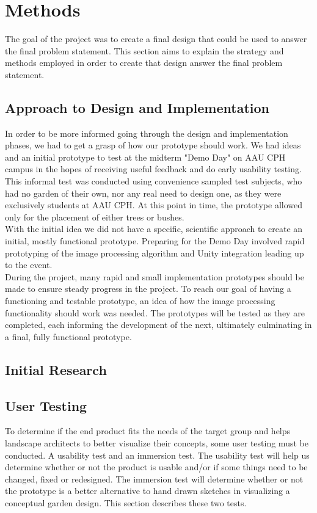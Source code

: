 \chapter{Methods}
The goal of the project was to create a final design that could be used to answer the final problem statement. This section aims to explain the strategy and methods employed in order to create that design answer the final problem statement.

 
\section{Approach to Design and Implementation}

In order to be more informed going through the design and implementation phases, we had to get a grasp of how our prototype should work. We had ideas and an initial prototype to test at the midterm "Demo Day" on AAU CPH campus in the hopes of receiving useful feedback and do early usability testing. This informal test was conducted using convenience sampled test subjects, who had no garden of their own, nor any real need to design one, as they were exclusively students at AAU CPH. At this point in time, the prototype allowed only for the placement of either trees or bushes.\\

With the initial idea we did not have a specific, scientific approach to create an initial, mostly functional prototype. Preparing for the Demo Day involved rapid prototyping of the image processing algorithm and Unity integration leading up to the event.\\

During the project, many rapid and small implementation prototypes should be made to ensure steady progress in the project.
To reach our goal of having a functioning and testable prototype, an idea of how the image processing functionality should work was needed. The prototypes will be tested as they are completed, each informing the development of the next, ultimately culminating in a final, fully functional prototype.\\
\section{Initial Research}


\section{User Testing}\label{sec:userTesting}
To determine if the end product fits the needs of the target group and helps landscape architects to better visualize their concepts, some user testing must be conducted. A usability test and an immersion test. The usability test will help us determine whether or not the product is usable and/or if some things need to be changed, fixed or redesigned. The immersion test will determine whether or not the prototype is a better alternative to hand drawn sketches in visualizing a conceptual garden design. This section describes these two tests.


